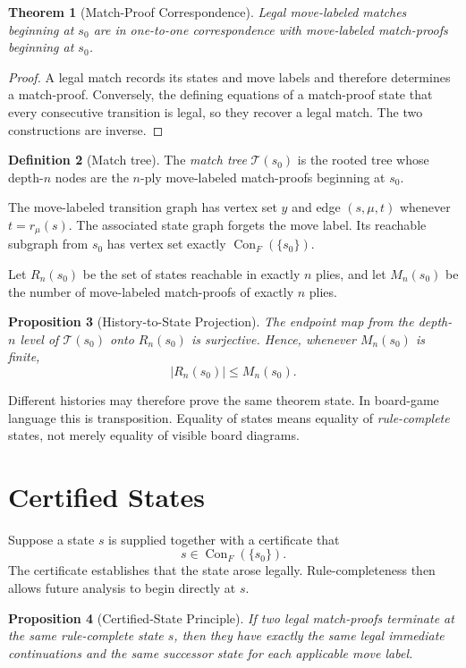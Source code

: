 \documentclass[11pt]{article}
\newtheorem{theorem}{Theorem}[section]
\newtheorem{proposition}[theorem]{Proposition}
\theoremstyle{definition}
\newtheorem{definition}[theorem]{Definition}
\theoremstyle{remark}
\newcommand{\Con}{\operatorname{Con}}
\begin{document}
\begin{theorem}[Match-Proof Correspondence]
Legal move-labeled matches beginning at $s_0$ are in one-to-one correspondence with move-labeled match-proofs beginning at $s_0$.
\end{theorem}

\begin{proof}
A legal match records its states and move labels and therefore determines a match-proof. Conversely, the defining equations of a match-proof state that every consecutive transition is legal, so they recover a legal match. The two constructions are inverse.
\end{proof}

\begin{definition}[Match tree]
The \emph{match tree} $\mathcal T(s_0)$ is the rooted tree whose depth-$n$ nodes are the $n$-ply move-labeled match-proofs beginning at $s_0$.
\end{definition}

The move-labeled transition graph has vertex set $y$ and edge $(s,\mu,t)$ whenever $t=r_\mu(s)$. The associated state graph forgets the move label. Its reachable subgraph from $s_0$ has vertex set exactly $\Con_F(\{s_0\})$.

Let $R_n(s_0)$ be the set of states reachable in exactly $n$ plies, and let $M_n(s_0)$ be the number of move-labeled match-proofs of exactly $n$ plies.

\begin{proposition}[History-to-State Projection]
The endpoint map from the depth-$n$ level of $\mathcal T(s_0)$ onto $R_n(s_0)$ is surjective. Hence, whenever $M_n(s_0)$ is finite,
\[
\boxed{|R_n(s_0)|\le M_n(s_0).}
\]
\end{proposition}

Different histories may therefore prove the same theorem state. In board-game language this is transposition. Equality of states means equality of \emph{rule-complete} states, not merely equality of visible board diagrams.

\section{Certified States}

Suppose a state $s$ is supplied together with a certificate that
\[
s\in\Con_F(\{s_0\}).
\]
The certificate establishes that the state arose legally. Rule-completeness then allows future analysis to begin directly at $s$.

\begin{proposition}[Certified-State Principle]
If two legal match-proofs terminate at the same rule-complete state $s$, then they have exactly the same legal immediate continuations and the same successor state for each applicable move label.
\end{proposition}
\end{document}
